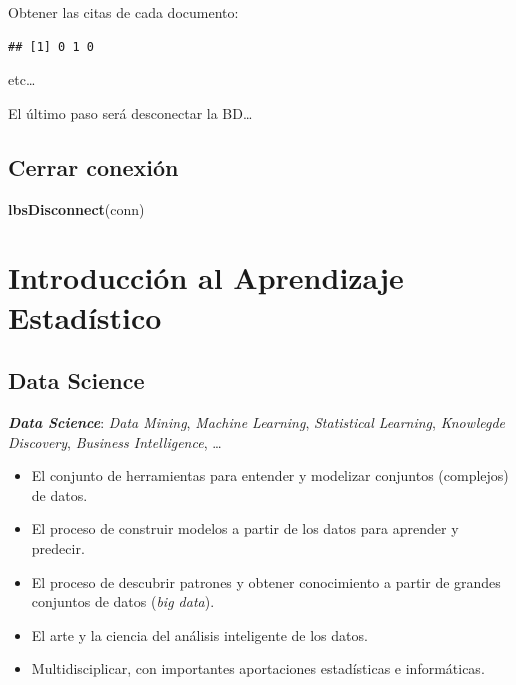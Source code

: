 \documentclass[]{book}
\newenvironment{Shaded}{\begin{snugshade}}{\end{snugshade}}
\newcommand{\ControlFlowTok}[1]{\textcolor[rgb]{0.13,0.29,0.53}{\textbf{#1}}}
\newcommand{\KeywordTok}[1]{\textcolor[rgb]{0.13,0.29,0.53}{\textbf{#1}}}
\newcommand{\NormalTok}[1]{#1}
\newcommand{\OperatorTok}[1]{\textcolor[rgb]{0.81,0.36,0.00}{\textbf{#1}}}
\newcommand{\StringTok}[1]{\textcolor[rgb]{0.31,0.60,0.02}{#1}}
\begin{document}
Obtener las citas de cada documento:

\begin{Shaded}
\end{Shaded}

\begin{verbatim}
## [1] 0 1 0
\end{verbatim}

etc\ldots{}

El último paso será desconectar la BD\ldots{}

\hypertarget{cerrar-conexion}{%
\section{Cerrar conexión}\label{cerrar-conexion}}

\begin{Shaded}
\begin{Highlighting}[]
\KeywordTok{lbsDisconnect}\NormalTok{(conn)}
\end{Highlighting}
\end{Shaded}

\hypertarget{introduccion-al-aprendizaje-estadistico}{%
\chapter{Introducción al Aprendizaje Estadístico}\label{introduccion-al-aprendizaje-estadistico}}

\hypertarget{data-science}{%
\section{Data Science}\label{data-science}}

\textbf{\emph{Data Science}}: \emph{Data Mining}, \emph{Machine Learning}, \emph{Statistical Learning}, \emph{Knowlegde Discovery}, \emph{Business Intelligence}, \ldots{}

\begin{itemize}
\item
  El conjunto de herramientas para entender y modelizar conjuntos
  (complejos) de datos.
\item
  El proceso de construir modelos a partir de los datos para aprender
  y predecir.
\item
  El proceso de descubrir patrones y obtener conocimiento a partir de
  grandes conjuntos de datos (\emph{big data}).
\item
  El arte y la ciencia del análisis inteligente de los datos.
\item
  Multidisciplicar, con importantes aportaciones
  estadísticas e informáticas.
\end{itemize}
\end{document}
